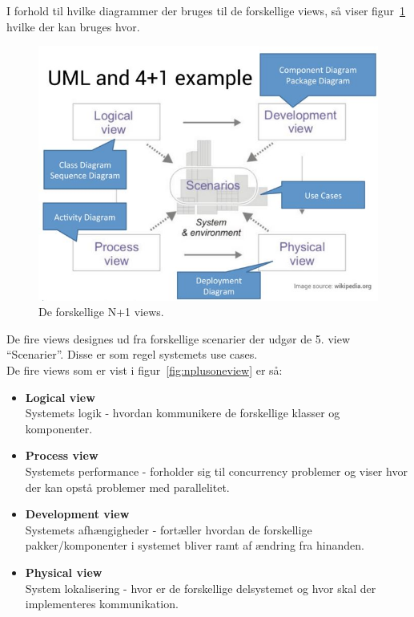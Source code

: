 I forhold til hvilke diagrammer der bruges til de forskellige views, så viser figur~\ref{fig:nplusonedia} hvilke der kan bruges hvor.

\begin{figure}[H]
	\centering
	\includegraphics[width=0.8\linewidth]{figs/nplusonedia}
	\caption{De forskellige N+1 views.}
	\label{fig:nplusonedia}
\end{figure}

De fire views designes ud fra forskellige scenarier der udgør de 5. view “Scenarier”. Disse er som regel systemets use cases.\\

De fire views som er vist i figur~\ref{fig:nplusoneview} er så:
\begin{itemize}
	\item \textbf{Logical view}\\
	Systemets logik - hvordan kommunikere de forskellige klasser og komponenter.
	\item \textbf{Process view}\\
	Systemets performance - forholder sig til concurrency problemer og viser hvor der kan opstå problemer med parallelitet.
	\item \textbf{Development view}\\
	Systemets afhængigheder - fortæller hvordan de forskellige pakker/komponenter i systemet bliver ramt af ændring fra hinanden.
	\item \textbf{Physical view}\\
	System lokalisering - hvor er de forskellige delsystemet og hvor skal der implementeres kommunikation.
\end{itemize}